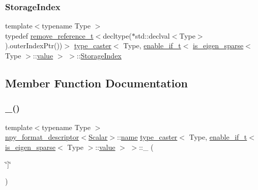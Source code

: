 \subsubsection{\texorpdfstring{StorageIndex}{StorageIndex}}
{\footnotesize\ttfamily template$<$typename Type $>$ \\
typedef \mbox{\hyperlink{detail_2common_8h_a3a08cea569e6926ac8d7d74dd7178b5f}{remove\+\_\+reference\+\_\+t}}$<$decltype($\ast$std\+::declval$<$Type$>$).outer\+Index\+Ptr())$>$ \mbox{\hyperlink{classtype__caster}{type\+\_\+caster}}$<$ Type, \mbox{\hyperlink{detail_2common_8h_a012819c9e8b5e04872a271f50f8b8196}{enable\+\_\+if\+\_\+t}}$<$ \mbox{\hyperlink{eigen_8h_af680e1af5697a93b0f4fc037a2100fbc}{is\+\_\+eigen\+\_\+sparse}}$<$ Type $>$\+::\mbox{\hyperlink{_s_d_l__opengl__glext_8h_a8ad81492d410ff2ac11f754f4042150f}{value}} $>$ $>$\+::\mbox{\hyperlink{structtype__caster_3_01_type_00_01enable__if__t_3_01is__eigen__sparse_3_01_type_01_4_1_1value_01_4_01_4_ab39275266506bb00041626baa4b70653}{Storage\+Index}}}



\subsection{Member Function Documentation}
\mbox{\label{structtype__caster_3_01_type_00_01enable__if__t_3_01is__eigen__sparse_3_01_type_01_4_1_1value_01_4_01_4_aa3b5aaf90f33e87012c04e52cb29b6d6}} 
\subsubsection{\texorpdfstring{\_()}{\_()}}
{\footnotesize\ttfamily template$<$typename Type $>$ \\
\mbox{\hyperlink{structnpy__format__descriptor}{npy\+\_\+format\+\_\+descriptor}}$<$\mbox{\hyperlink{structtype__caster_3_01_type_00_01enable__if__t_3_01is__eigen__sparse_3_01_type_01_4_1_1value_01_4_01_4_a5136dbf552bfcb9ca707f5ed51fed848}{Scalar}}$>$\+::\mbox{\hyperlink{structname}{name}} \mbox{\hyperlink{classtype__caster}{type\+\_\+caster}}$<$ Type, \mbox{\hyperlink{detail_2common_8h_a012819c9e8b5e04872a271f50f8b8196}{enable\+\_\+if\+\_\+t}}$<$ \mbox{\hyperlink{eigen_8h_af680e1af5697a93b0f4fc037a2100fbc}{is\+\_\+eigen\+\_\+sparse}}$<$ Type $>$\+::\mbox{\hyperlink{_s_d_l__opengl__glext_8h_a8ad81492d410ff2ac11f754f4042150f}{value}} $>$ $>$\+::\+\_\+ (\begin{DoxyParamCaption}\item[{\char`\"{}\mbox{]}\char`\"{}}]{ }\end{DoxyParamCaption})}


